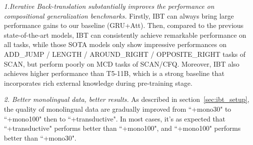 \documentclass[letterpaper]{article} %
\begin{document}
\textit{1.Iterative Back-translation substantially improves the performance on compositional generalization benchmarks.}
Firstly, IBT can always bring large performance gains to our baseline (GRU+Att).
Then, compared to the previous state-of-the-art models, IBT can consistently achieve remarkable performance on all tasks, while those SOTA models only show impressive performances on ADD\_JUMP / LENGTH / AROUND\_RIGHT / OPPOSITE\_RIGHT tasks of SCAN, but perform poorly on MCD tasks of SCAN/CFQ.
Moreover, IBT also achieves higher performance than T5-11B, which is a strong baseline that incorporates rich external knowledge during pre-training stage.




\textit{2. Better monolingual data, better results.} 
As described in section~\ref{sec:ibt_setup}, the quality of monolingual data are gradually improved from  ``+mono30" to ``+mono100" then to ``+transductive". In most cases, it's as expected that ``+transductive" performs better than ``+mono100", and ``+mono100" performs better than ``+mono30".

\end{document}
